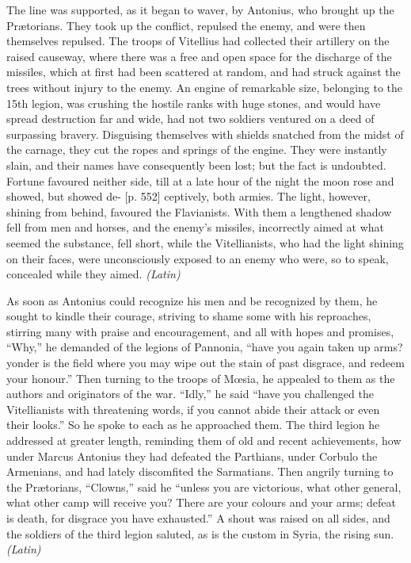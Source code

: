 
The line was supported, as it began to waver, by Antonius, who brought up the Prætorians. They took up the conflict, repulsed the enemy, and were then themselves repulsed. The troops of Vitellius had collected their artillery on the raised causeway, where there was a free and open space for the discharge of the missiles, which at first had been scattered at random, and had struck against the trees without injury to the enemy. An engine of remarkable size, belonging to the 15th legion, was crushing the hostile ranks with huge stones, and would have spread destruction far and wide, had not two soldiers ventured on a deed of surpassing bravery. Disguising themselves with shields snatched from the midst of the carnage, they cut the ropes and springs of the engine. They were instantly slain, and their names have consequently been lost; but the fact is undoubted. Fortune favoured neither side, till at a late hour of the night the moon rose and showed, but showed de- [p. 552] ceptively, both armies. The light, however, shining from behind, favoured the Flavianists. With them a lengthened shadow fell from men and horses, and the enemy's missiles, incorrectly aimed at what seemed the substance, fell short, while the Vitellianists, who had the light shining on their faces, were unconsciously exposed to an enemy who were, so to speak, concealed while they aimed. \emph{(Latin)}


As soon as Antonius could recognize his men and be recognized by them, he sought to kindle their courage, striving to shame some with his reproaches, stirring many with praise and encouragement, and all with hopes and promises, ``Why,'' he demanded of the legions of Pannonia, ``have you again taken up arms? yonder is the field where you may wipe out the stain of past disgrace, and redeem your honour.'' Then turning to the troops of Mœsia, he appealed to them as the authors and originators of the war. ``Idly,'' he said ``have you challenged the Vitellianists with threatening words, if you cannot abide their attack or even their looks.'' So he spoke to each as he approached them. The third legion he addressed at greater length, reminding them of old and recent achievements, how under Marcus Antonius they had defeated the Parthians, under Corbulo the Armenians, and had lately discomfited the Sarmatians. Then angrily turning to the Prætorians, ``Clowns,'' said he ``unless you are victorious, what other general, what other camp will receive you? There are your colours and your arms; defeat is death, for disgrace you have exhausted.'' A shout was raised on all sides, and the soldiers of the third legion saluted, as is the custom in Syria, the rising sun. \emph{(Latin)}


